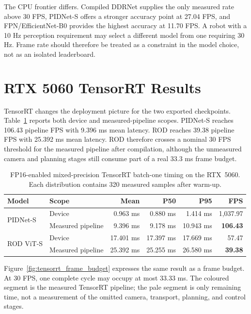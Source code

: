 The CPU frontier differs. Compiled DDRNet supplies the only measured rate above
30 FPS, PIDNet-S offers a stronger accuracy point at 27.04 FPS, and
FPN/EfficientNet-B0 provides the highest accuracy at 11.70 FPS. A robot with a
10 Hz perception requirement may select a different model from one requiring
30 Hz. Frame rate should therefore be treated as a constraint in the model
choice, not as an isolated leaderboard.

\section{RTX 5060 TensorRT Results}

TensorRT changes the deployment picture for the two exported checkpoints.
Table~\ref{tab:tensorrt_speed} reports both device and measured-pipeline
scopes. PIDNet-S reaches 106.43 pipeline FPS with 9.396 ms mean latency. ROD
reaches 39.38 pipeline FPS with 25.392 ms mean latency. ROD therefore crosses
a nominal 30 FPS threshold for the measured pipeline after compilation,
although the unmeasured camera and planning stages still consume part of a
real 33.3 ms frame budget.

\begin{table}[H]
\centering
\caption[TensorRT batch-one timing on the RTX 5060.]{FP16-enabled
mixed-precision TensorRT batch-one timing on the
RTX~5060. Each distribution contains 320 measured samples after warm-up.}
\label{tab:tensorrt_speed}
\small
\begin{tabular}{@{}llrrrr@{}}
\toprule
\textbf{Model} & \textbf{Scope} & \textbf{Mean} & \textbf{P50} & \textbf{P95} & \textbf{FPS} \\
\midrule
\multirow{2}{*}{PIDNet-S}
 & Device & 0.963 ms & 0.880 ms & 1.414 ms & 1,037.97 \\
 & Measured pipeline & 9.396 ms & 9.178 ms & 10.943 ms & \textbf{106.43} \\
\midrule
\multirow{2}{*}{ROD ViT-S}
 & Device & 17.401 ms & 17.397 ms & 17.669 ms & 57.47 \\
 & Measured pipeline & 25.392 ms & 25.255 ms & 26.580 ms & \textbf{39.38} \\
\bottomrule
\end{tabular}
\end{table}

Figure~\ref{fig:tensorrt_frame_budget} expresses the same result as a frame
budget. At 30 FPS, one complete cycle may occupy at most 33.33 ms. The coloured
segment is the measured TensorRT pipeline; the pale segment is only remaining
time, not a measurement of the omitted camera, transport, planning, and control
stages.

